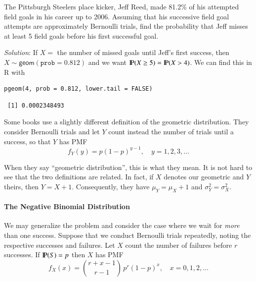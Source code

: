 \documentclass[captions=tableheading]{scrbook}
\begin{document}
\begin{example}
The Pittsburgh Steelers place kicker, Jeff Reed, made 81.2\% of his attempted field goals in his career up to 2006. Assuming that his successive field goal attempts are approximately Bernoulli trials, find the probability that Jeff misses at least 5 field goals before his first successful goal.

\emph{Solution}: If \(X=\) the number of missed goals until Jeff's first success, then \(X\sim\mathsf{geom}(\mathtt{prob}=0.812)\) and we want \(\P(X\geq5)=\P(X>4)\). We can find this in \textsf{R} with


\begin{verbatim}
pgeom(4, prob = 0.812, lower.tail = FALSE)
\end{verbatim}

\begin{verbatim}
 [1] 0.0002348493
\end{verbatim}

\end{example}


\begin{note}
Some books use a slightly different definition of the geometric distribution. They consider Bernoulli trials and let \(Y\) count instead the number of trials until a success, so that \(Y\) has PMF
\begin{equation}
f_{Y}(y)=p(1-p)^{y-1},\quad y=1,2,3,\ldots
\end{equation}

When they say ``geometric distribution'', this is what they mean. It is not hard to see that the two definitions are related. In fact, if \(X\) denotes our geometric and \(Y\) theirs, then \(Y=X+1\). Consequently, they have \(\mu_{Y}=\mu_{X}+1\) and \(\sigma_{Y}^{2}=\sigma_{X}^{2}\).
\end{note}

\paragraph*{The Negative Binomial Distribution}
\label{sub:The-Negative-Binomial}

We may generalize the problem and consider the case where we wait for \emph{more} than one success. Suppose that we conduct Bernoulli trials repeatedly, noting the respective successes and failures. Let \(X\) count the number of failures before \(r\) successes. If \(\P(S)=p\) then \(X\) has PMF
\begin{equation}
f_{X}(x)={r+x-1 \choose r-1}\, p^{r}(1-p)^{x},\quad x=0,1,2,\ldots
\end{equation}
\end{document}
